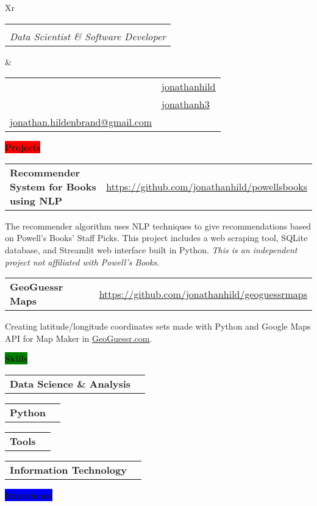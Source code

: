 \documentclass[letterpaper,12pt]{article}[leftmargin=*]
\makeatletter
\def\fullname{Jonathan Hildenbrand}
\def\subtitle{Data Scientist \& Software Developer}
\def\githubicon{\faGithub}
\def\githublink{https://github.com/jonathanhild}
\def\githubtext{jonathanhild}
\def\linkedinicon{\faLinkedin}
\def\linkedinlink{https://linkedin.com/in/jonathanh3}
\def\linkedintext{jonathanh3}
\def\phoneicon{\faPhone}
\def\phonetext{+1-971-409-0695}
\def\emailicon{\faEnvelope}
\def\emaillink{mailto:jonathan.hildenbrand+resume@gmail.com}
\def\emailtext{jonathan.hildenbrand@gmail.com}
\def\locationicon{\faMapMarker}
\def\locationtext{Portland, Oregon}
\def\targeticon{\faBinoculars}
\def\targettext{Local, Remote WFH \& Relocation}
\def\headertype{\doublecol} %
\def\entryspacing{-0pt}
\def\location{\hspace{3pt}\locationicon \hspace{5pt}{\color{links}\locationtext}}
\def\target{\targeticon\hspace{3pt}{\color{links}\targettext}}
\def\phone{\phoneicon\hspace{3pt}{\color{links}{\phonetext}}}
\def\linkedin{\linkedinicon\hspace{3pt}\href{\linkedinlink}{\underline{\linkedintext}}}
\def\email{\emailicon\hspace{3pt}\href{\emaillink}{\underline{\emailtext}}}
\def\github{\githubicon\hspace{3pt}\href{\githublink}{\underline{\githubtext}}}
\newcommand{\projects}[2]{\vspace{6pt}
  \colorbox{Red}{\color{white}\raggedbottom\normalsize\textbf{{#1}{\hspace{9pt}#2\hspace{4pt}}}}
}
\newcommand{\skills}[2]{\vspace{6pt}
  \colorbox{Green}{\color{white}\raggedbottom\normalsize\textbf{{#1}{\hspace{9pt}#2\hspace{4pt}}}}
}
\newcommand{\experience}[2]{\vspace{6pt}
  \colorbox{Blue}{\color{white}\raggedbottom\normalsize\textbf{{#1}{\hspace{9pt}#2\hspace{4pt}}}}
}
\newcommand{\resumeEntryStart}{\begin{itemize}[leftmargin=2.5mm]}
\newcommand{\resumeEntryEnd}{\end{itemize}\vspace{\entryspacing}}
\newcommand{\resumeItemListStart}{\begin{itemize}[leftmargin=4.5mm]}
\newcommand{\resumeItemListEnd}{\end{itemize}}
\newcommand{\resumeItem}[1]{
  \item\small{
    {#1 \vspace{-2pt}}
  }
}
\newcommand{\repo}[2]{\href{#1}{\underline{#2}}}
\newcommand{\resumeEntryTD}[2]{
  \vspace{-1pt}\item[]
    \begin{tabularx}{0.97\textwidth}{X@{\hspace{60pt}}r}
      \textbf{\color{primary}#1} & {\firabook\color{accent}\small#2} \\
    \end{tabularx}\vspace{-6pt}
}
\newcommand{\resumeEntryS}[2]{
  \item[]
    \vspace{-1pt}
      \begin{tabular}{ p{2in} m{5.5in} }
      {\small{\textbf{#1 }}} & {\small{#2}}
      \end{tabular}\vspace{-6pt}
}
\newcommand{\tag}[1]{%
  \tikzmarknode[fill=white,fill
opacity=0,draw=subtle!60!subtle,thick,rounded corners,inner sep=0.4ex,text height=1.5ex,text depth=.25ex, text opacity=1]{test}{\small{#1}}
}
\newcommand{\doublecol}[6]{
  \begin{tabularx}{\textwidth}{Xr}
    {
      \begin{tabular}[c]{l}
        \fontsize{24}{34}\selectfont{\color{primary}{{\textbf{\fullname}}}} \\
        {\textit{\subtitle}} %
      \end{tabular}
    } & {
      \begin{tabular}[c]{l@{\hspace{1.5em}}l}
        {\small#4} & {\small#1} \\
        {\small#5} & {\small#2} \\
        {\small#6} & {\small#3}
      \end{tabular}
    }
  \end{tabularx}
}
\newcommand{\singlecol}[6]{
  \begin{tabularx}{\textwidth}{Xr}
    {
      \begin{tabular}[b]{l}
        \fontsize{35}{45}\selectfont{\color{primary}{{\textbf{\fullname}}}} \\
        {\textit{\subtitle}} %
      \end{tabular}
    } & {
      \begin{tabular}[c]{l}
        {\small#1} \\
        {\small#2} \\
        {\small#3} \\
        {\small#4} \\
        {\small#5} \\
        {\small#6}
      \end{tabular}
    }
  \end{tabularx}
}
\makeatother
\begin{document}
\headertype{\github}{\linkedin}{\phone}{\location}{\target}{\email} %

\projects{\faFlask}{Projects}

\resumeEntryStart{
  \resumeEntryTD{Recommender System for Books using NLP}{\repo{https://github.com/jonathanhild/powellsbooks}{https://github.com/jonathanhild/powellsbooks}}
  \resumeItemListStart{
    \resumeItem{\tag{In Process} The recommender algorithm uses NLP techniques to give recommendations based on Powell's Books' Staff Picks. This project includes a web scraping tool, SQLite database, and Streamlit web interface built in Python. \textit{This is an independent project not affiliated with Powell’s Books.}}}
  \resumeItemListEnd{}
  \resumeEntryTD{GeoGuessr Maps}{\repo{https://github.com/jonathanhild/geoguessrmaps}{https://github.com/jonathanhild/geoguessrmaps}}
  \resumeItemListStart{
    \resumeItem{Creating latitude/longitude coordinates sets made with Python and Google Maps API for Map Maker in \href{https://www.geoguessr.com}{\underline{GeoGuessr.com}}.}}
  \resumeItemListEnd}
\resumeEntryEnd{}

\skills{\faGears}{Skills}

\resumeEntryStart{
  \resumeEntryS{Data Science \& Analysis}{\tag{Data Cleaning \& ETL}\tag{Machine Learning}\tag{Web Scraping}\tag{Database Design}\tag{Regex}\tag{JIRA \& Project Management}\tag{Technical Writing \& Communication}\tag{Accounting}}
  \resumeEntryS{Python}{\tag{Pandas}\tag{Numpy}\tag{SKLearn}\tag{Matplotlib}\tag{Seaborn}\tag{SQLAlchemy}\tag{Beautiful Soup}}}
\resumeEntryS{Tools}{\tag{SQL}\tag{Anaconda}\tag{PostgreSQL}\tag{SQL Server}\tag{SQLite}\tag{SSMS}\tag{Git \& GitHub}\tag{Excel}}
\resumeEntryS{Information Technology}{\tag{Database Admin}\tag{Ubuntu Linux 16.04+}\tag{Windows Server Admin}\tag{Dynamics NAV}}
\resumeEntryEnd{}

\experience{\faPieChart}{Experience}
\end{document}
